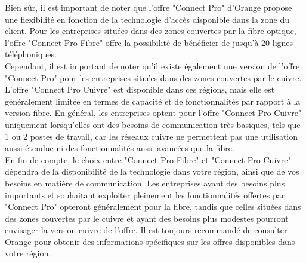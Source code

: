 \documentclass[12pt, a4paper]{article}
\begin{document}
Bien sûr, il est important de noter que l'offre
"Connect Pro" d'Orange propose une flexibilité en
fonction de la technologie d'accès disponible dans
la zone du client. Pour les entreprises situées dans des
zones couvertes par la fibre optique, l'offre
"Connect Pro Fibre" offre la possibilité de
bénéficier de jusqu'à 20 lignes téléphoniques.\\

Cependant, il est important de noter qu'il
existe également une version de l'offre "Connect Pro"
pour les entreprises situées dans des zones
couvertes par le cuivre. L'offre "Connect Pro Cuivre"
est disponible dans ces régions, mais elle est
généralement limitée en termes de capacité et de
fonctionnalités par rapport à la version fibre.
En général, les entreprises optent pour l'offre
"Connect Pro Cuivre" uniquement lorsqu'elles ont
des besoins de communication très basiques, tels
que 1 ou 2 postes de travail, car les réseaux
cuivre ne permettent pas une utilisation aussi
étendue ni des fonctionnalités aussi avancées 
que la fibre.\\

En fin de compte, le choix entre "Connect Pro
Fibre" et "Connect Pro Cuivre" dépendra de la
disponibilité de la technologie dans votre région,
ainsi que de vos besoins en matière de communication.
Les entreprises ayant des besoins plus importants
et souhaitant exploiter pleinement les fonctionnalités
offertes par "Connect Pro" opteront généralement
pour la fibre, tandis que celles situées dans des
zones couvertes par le cuivre et ayant des besoins
plus modestes pourront envisager la version cuivre
de l'offre. Il est toujours recommandé de consulter
Orange pour obtenir des informations spécifiques sur
les offres disponibles dans votre région.
\par\endgroup
\end{document}
